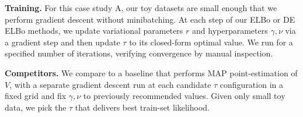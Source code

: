 \textbf{Training.}
For this case study A, our toy datasets are small enough that we perform gradient descent without minibatching. At each step of our ELBo or DE ELBo methods, we update variational parameters $r$ and hyperparameters $\gamma,\nu$ via a gradient step and then update $\tau$ to its closed-form optimal value. We run for a specified number of iterations, verifying convergence by manual inspection.

\textbf{Competitors.}
We compare to a baseline that performs MAP point-estimation of $V$, with a separate gradient descent run at each candidate $\tau$ configuration in a fixed grid and fix $\gamma,\nu$ to previously recommended values.
Given only small toy data, we pick the $\tau$ that delivers best train-set likelihood.